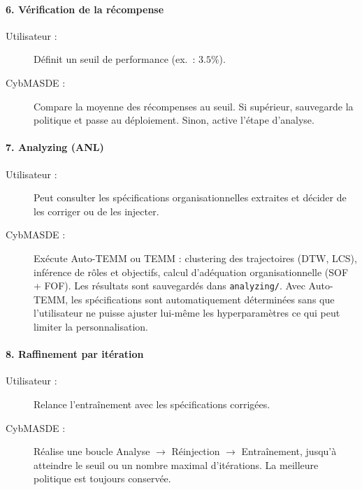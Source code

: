 \paragraph{6. Vérification de la récompense}
\begin{description}
  \item[Utilisateur :] Définit un seuil de performance (ex.~: $3.5\%$).
  \item[CybMASDE :] Compare la moyenne des récompenses au seuil. Si supérieur, sauvegarde la politique et passe au déploiement. Sinon, active l’étape d’analyse.
\end{description}

\paragraph{7. Analyzing (ANL)}
\begin{description}
  \item[Utilisateur :] Peut consulter les spécifications organisationnelles extraites et décider de les corriger ou de les injecter.
  \item[CybMASDE :] Exécute Auto-TEMM ou TEMM : clustering des trajectoires (DTW, LCS), inférence de rôles et objectifs, calcul d’adéquation organisationnelle (SOF + FOF). Les résultats sont sauvegardés dans \texttt{analyzing/}. Avec Auto-TEMM, les spécifications sont automatiquement déterminées sans que l'utilisateur ne puisse ajuster lui-même les hyperparamètres ce qui peut limiter la personnalisation.
\end{description}

\paragraph{8. Raffinement par itération}
\begin{description}
  \item[Utilisateur :] Relance l’entraînement avec les spécifications corrigées.
  \item[CybMASDE :] Réalise une boucle Analyse $\rightarrow$ Réinjection $\rightarrow$ Entraînement, jusqu’à atteindre le seuil ou un nombre maximal d’itérations. La meilleure politique est toujours conservée.
\end{description}

